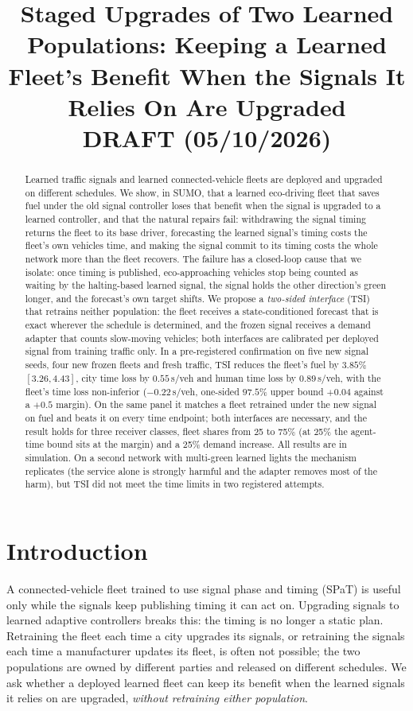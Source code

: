 \documentclass[11pt]{article}
\title{Staged Upgrades of Two Learned Populations: Keeping a Learned Fleet's Benefit When the Signals It Relies On Are Upgraded\\[4pt]
\large DRAFT (05/10/2026)}
\date{}
\begin{document}
\maketitle

\begin{abstract}
Learned traffic signals and learned connected-vehicle fleets are deployed and upgraded on different schedules. We show, in SUMO, that a
learned eco-driving fleet that saves fuel under the old signal controller loses that benefit when the signal is upgraded to a learned
controller, and that the natural repairs fail: withdrawing the signal timing returns the fleet to its base driver, forecasting the learned
signal's timing costs the fleet's own vehicles time, and making the signal commit to its timing costs the whole network more than the fleet
recovers. The failure has a closed-loop cause that we isolate: once timing is published, eco-approaching vehicles stop being counted as
waiting by the halting-based learned signal, the signal holds the other direction's green longer, and the forecast's own target shifts.
We propose a \emph{two-sided interface} (TSI) that retrains neither population: the fleet receives a state-conditioned forecast that is
exact wherever the schedule is determined, and the frozen signal receives a demand adapter that counts slow-moving vehicles; both
interfaces are calibrated per deployed signal from training traffic only. In a pre-registered confirmation on five new signal seeds, four
new frozen fleets and fresh traffic, TSI reduces the fleet's fuel by $3.85\%$ $[3.26, 4.43]$, city time loss by $0.55$\,s/veh and human
time loss by $0.89$\,s/veh, with the fleet's time loss non-inferior ($-0.22$\,s/veh, one-sided $97.5\%$ upper bound $+0.04$ against a
$+0.5$ margin). On the same panel it matches a fleet retrained under the new signal on fuel and beats it on every time endpoint; both
interfaces are necessary, and the result holds for three receiver classes, fleet shares from 25 to 75\% (at 25\% the agent-time bound sits at the margin) and a 25\% demand increase. All
results are in simulation. On a second network with multi-green learned lights the mechanism replicates (the service alone is strongly
harmful and the adapter removes most of the harm), but TSI did not meet the time limits in two registered attempts.
\end{abstract}

\section{Introduction}
A connected-vehicle fleet trained to use signal phase and timing (SPaT) is useful only while the signals keep publishing timing it can act
on. Upgrading signals to learned adaptive controllers breaks this: the timing is no longer a static plan. Retraining the fleet each time a
city upgrades its signals, or retraining the signals each time a manufacturer updates its fleet, is often not possible; the two populations
are owned by different parties and released on different schedules. We ask whether a deployed learned fleet can keep its benefit when the
learned signals it relies on are upgraded, \emph{without retraining either population}.
\end{document}
